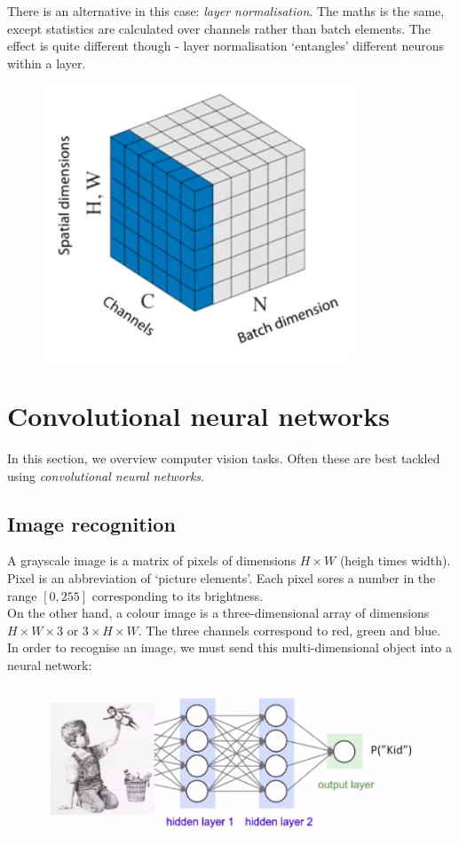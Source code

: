  There is an alternative in this case: \textit{layer normalisation}. The maths is the same, except statistics are calculated over channels rather than batch elements. The effect is quite different though - layer normalisation `entangles' different neurons within a layer.
 \begin{figure}[H]
 \centering
 \includegraphics[scale=0.4]{layernormalisation.png}
 \end{figure}
 
 
 
 
 
 
 \newpage
 \section{Convolutional neural networks}
 
In this section, we overview computer vision tasks. Often these are best tackled using \textit{convolutional neural networks}.


\subsection{Image recognition}
A grayscale image is a matrix of pixels of dimensions $H \times W$ (heigh times width). Pixel is an abbreviation of `picture elements'. Each pixel sores a number in the range $[0,255]$ corresponding to its brightness.\\

On the other hand, a colour image is a three-dimensional array of dimensions $H \times W \times 3$ or $3 \times H \times W$. The three channels correspond to red, green and blue.\\

In order to recognise an image, we must send this multi-dimensional object into a neural network: 
\begin{figure}[H]
\centering
\includegraphics[scale=0.4]{imagerecognition.png}
\end{figure}


